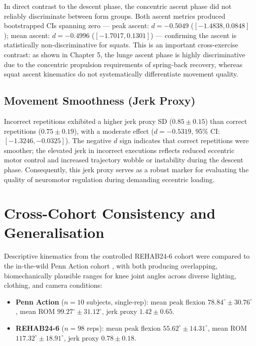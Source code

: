 In direct contrast to the descent phase, the concentric ascent phase did not reliably discriminate between form groups. Both ascent metrics produced bootstrapped CIs spanning zero — peak ascent: $d = -0.5049$ ($[-1.4838, 0.0848]$); mean ascent: $d = -0.4996$ ($[-1.7017, 0.1301]$) — confirming the ascent is statistically non-discriminative for squats. This is an important cross-exercise contrast: as shown in Chapter 5, the lunge ascent phase is highly discriminative due to the concentric propulsion requirements of spring-back recovery, whereas squat ascent kinematics do not systematically differentiate movement quality.

\subsection{Movement Smoothness (Jerk Proxy)}
\label{sec:4-2-4-movement-smoothness-jerk-proxy}

Incorrect repetitions exhibited a higher jerk proxy SD ($0.85 \pm 0.15$) than correct repetitions ($0.75 \pm 0.19$), with a moderate effect ($d = -0.5319$, 95\% CI: $[-1.3246, -0.0325]$). The negative $d$ sign indicates that correct repetitions were smoother; the elevated jerk in incorrect executions reflects reduced eccentric motor control and increased trajectory wobble or instability during the descent phase. Consequently, this jerk proxy serves as a robust marker for evaluating the quality of neuromotor regulation during demanding eccentric loading.



\section{Cross-Cohort Consistency and Generalisation}
\label{sec:4-3-cross-cohort-consistency-and-generalisation}


Descriptive kinematics from the controlled REHAB24-6 cohort were compared to the in-the-wild Penn Action cohort \citep{Zhang_Penn_Action_2013}, with both producing overlapping, biomechanically plausible ranges for knee joint angles across diverse lighting, clothing, and camera conditions:
\begin{itemize}
  \item \textbf{Penn Action} ($n = 10$ subjects, single-rep): mean peak flexion $78.84^\circ \pm 30.76^\circ$, mean ROM $99.27^\circ \pm 31.12^\circ$, jerk proxy $1.42 \pm 0.65$.
  \item \textbf{REHAB24-6} ($n = 98$ reps): mean peak flexion $55.62^\circ \pm 14.31^\circ$, mean ROM $117.32^\circ \pm 18.91^\circ$, jerk proxy $0.78 \pm 0.18$.
\end{itemize}

